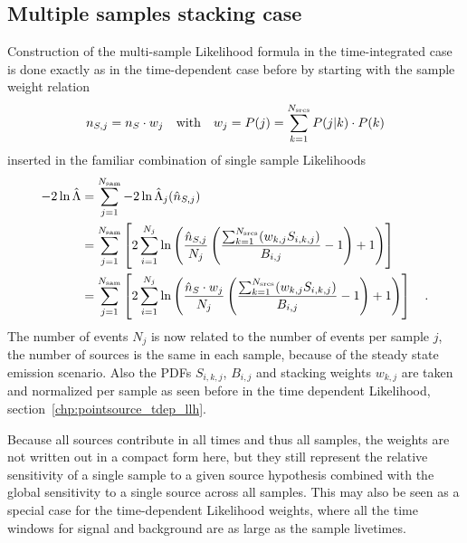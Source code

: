 \subsection{Multiple samples stacking case}
Construction of the multi-sample Likelihood formula in the time-integrated case is done exactly as in the time-dependent case before by starting with the sample weight relation
\begin{equation}
  n_{S,j} = n_S \cdot w_j
  \quad\text{with}\quad
  w_j = P(j) = \sum_{k=1}^{N_\text{srcs}} P(j|k)\cdot P(k)
\end{equation}
inserted in the familiar combination of single sample Likelihoods
\begin{align}
  -2\ln\hat{\Lambda}
  &= \sum_{j=1}^{N_\text{sam}} -2\ln\hat{\Lambda}_j(\hat{n}_{S,j}) \\
  &= \sum_{j=1}^{N_\text{sam}} \left[
      2\sum_{i=1}^{N_j} \ln\left(
        \frac{\hat{n}_{S,j}}{N_j}\left(
          \frac{\sum_{k=1}^{N_\text{srcs}}(w_{k,j} S_{i,k,j})}{B_{i,j}} - 1
        \right) + 1
      \right)
    \right] \\
  &= \sum_{j=1}^{N_\text{sam}} \left[
      2\sum_{i=1}^{N_j} \ln\left(
        \frac{\hat{n}_S \cdot w_j}{N_j}\left(
          \frac{\sum_{k=1}^{N_\text{srcs}}(w_{k,j} S_{i,k,j})}{B_{i,j}} - 1
        \right) + 1
      \right)
    \right]
  \quad\text{.}
\end{align}
The number of events $N_j$ is now related to the number of events per sample $j$, the number of sources is the same in each sample, because of the steady state emission scenario.
Also the PDFs $S_{i,k,j}$, $B_{i,j}$ and stacking weights $w_{k,j}$ are taken and normalized per sample as seen before in the time dependent Likelihood, section~\ref{chp:pointsource_tdep_llh}.

Because all sources contribute in all times and thus all samples, the weights are not written out in a compact form here, but they still represent the relative sensitivity of a single sample to a given source hypothesis combined with the global sensitivity to a single source across all samples.
This may also be seen as a special case for the time-dependent Likelihood weights, where all the time windows for signal and background are as large as the sample livetimes.

